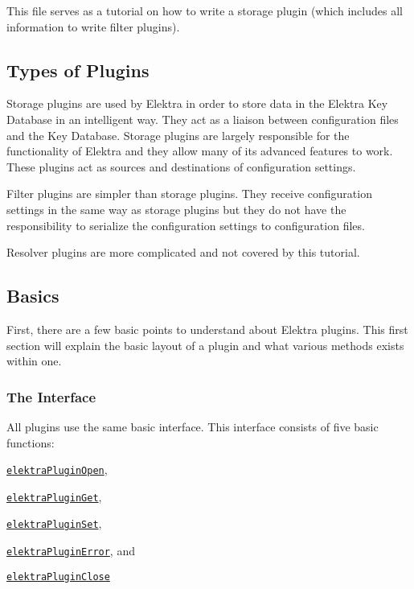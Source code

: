This file serves as a tutorial on how to write a storage plugin (which includes all information to write filter plugins).

\subsection*{Types of Plugins}


\begin{DoxyItemize}
\item Storage plugins are used by Elektra in order to store data in the Elektra Key Database in an intelligent way. They act as a liaison between configuration files and the Key Database. Storage plugins are largely responsible for the functionality of Elektra and they allow many of its advanced features to work. These plugins act as sources and destinations of configuration settings.
\item Filter plugins are simpler than storage plugins. They receive configuration settings in the same way as storage plugins but they do not have the responsibility to serialize the configuration settings to configuration files.
\item Resolver plugins are more complicated and not covered by this tutorial.
\end{DoxyItemize}

\subsection*{Basics}

First, there are a few basic points to understand about Elektra plugins. This first section will explain the basic layout of a plugin and what various methods exists within one.

\subsubsection*{The Interface}

All plugins use the same basic interface. This interface consists of five basic functions\+:


\begin{DoxyItemize}
\item \href{https://doc.libelektra.org/api/current/html/group__plugin.html#ga23c2eb3584e38a4d494eb8f91e5e3d8d}{\tt {\ttfamily elektra\+Plugin\+Open}},
\item \href{https://doc.libelektra.org/api/current/html/group__plugin.html#gacb69f3441c6d84241b4362f958fbe313}{\tt {\ttfamily elektra\+Plugin\+Get}},
\item \href{https://doc.libelektra.org/api/current/html/group__plugin.html#gae65781a1deb34efc79c8cb9d9174842c}{\tt {\ttfamily elektra\+Plugin\+Set}},
\item \href{https://doc.libelektra.org/api/current/html/group__plugin.html#gad74b35f558ac7c3262f6069c5c47dc79}{\tt {\ttfamily elektra\+Plugin\+Error}}, and
\item \href{https://doc.libelektra.org/api/current/html/group__plugin.html#ga1236aefe5b2baf8b7bf636ba5aa9ea29}{\tt {\ttfamily elektra\+Plugin\+Close}}
\end{DoxyItemize}

